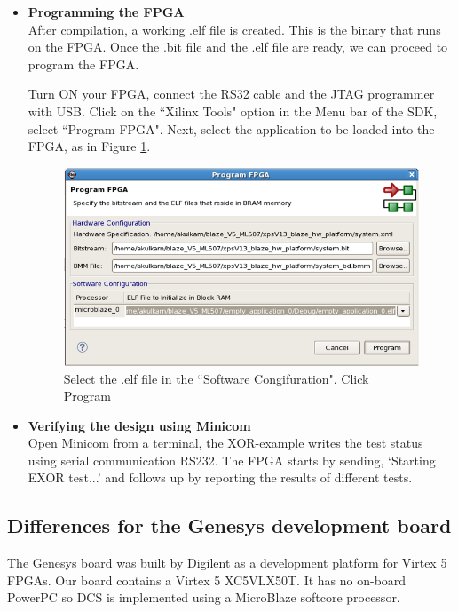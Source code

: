 \documentclass[a4paper,oneside]{memoir}
\begin{document}
\begin{itemize}
\item \textbf{Programming the FPGA}\label{sec:program_FPGA_blaze}\\
After compilation, a working .elf file is created. This is the binary that runs on the FPGA. Once the .bit file and the .elf file are ready, we can proceed to program the FPGA. 

Turn ON your FPGA, connect the RS32 cable and the JTAG programmer with USB. Click on the ``Xilinx Tools" option in the Menu bar of the SDK, select ``Program FPGA". Next, select the application to be loaded into the FPGA, as in Figure \ref{fig:softwarestep8}.

\begin{figure}[H]
\centering
\includegraphics[scale=0.5]{softwarestep8}
\caption{Select the .elf file in the ``Software Congifuration". Click Program\label{fig:softwarestep8}}
\end{figure}

\item \textbf{Verifying the design using Minicom}\label{sec:verifying_minicom_blaze}\\ 
Open Minicom from a terminal, the XOR-example writes the test status using serial communication RS232. The FPGA starts by sending, `Starting EXOR test...' and follows up by reporting the results of different tests. 

\end{itemize}

\subsection{Differences for the Genesys development board}\label{sec:diff_genesys}
The Genesys board was built by Digilent as a development platform for Virtex 5 FPGAs. Our board contains a Virtex 5 XC5VLX50T. It has no on-board PowerPC so DCS is implemented using a MicroBlaze softcore processor.
\end{document}
